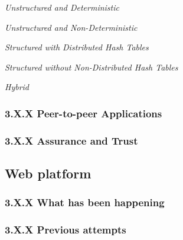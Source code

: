 \textit{Unstructured and Deterministic}


\textit{Unstructured and Non-Deterministic}


\textit{Structured with Distributed Hash Tables}


\textit{Structured without Non-Distributed Hash Tables}

\textit{Hybrid}


\subsubsection{3.X.X Peer-to-peer Applications}


\subsubsection{3.X.X Assurance and Trust}



\subsection{Web platform} 


\subsubsection{3.X.X What has been happening}

\subsubsection{3.X.X Previous attempts}



% 
